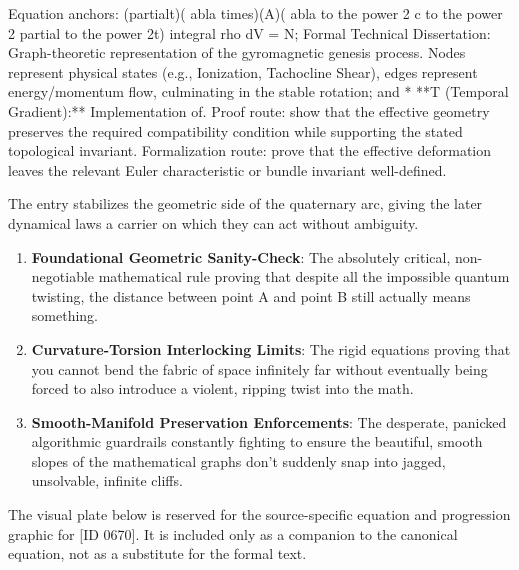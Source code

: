 Equation anchors: (partialt)( abla times)(A)( abla to the power 2   c to the power  2 partial to the power 2t) integral rho dV = N; Formal Technical Dissertation: Graph-theoretic representation of the gyromagnetic genesis process. Nodes represent physical states (e.g., Ionization, Tachocline Shear), edges represent energy/momentum flow, culminating in the stable rotation; and * **T (Temporal Gradient):** Implementation of. Proof route: show that the effective geometry preserves the required compatibility condition while supporting the stated topological invariant. Formalization route: prove that the effective deformation leaves the relevant Euler characteristic or bundle invariant well-defined.

The entry stabilizes the geometric side of the quaternary arc, giving the later dynamical laws a carrier on which they can act without ambiguity.
\endgroup

\begin{enumerate}[leftmargin=1.6em,itemsep=6pt,topsep=4pt]
\item \textbf{Foundational Geometric Sanity-Check}: The absolutely critical, non-negotiable mathematical rule proving that despite all the impossible quantum twisting, the distance between point A and point B still actually means something.
\item \textbf{Curvature-Torsion Interlocking Limits}: The rigid equations proving that you cannot bend the fabric of space infinitely far without eventually being forced to also introduce a violent, ripping twist into the math.
\item \textbf{Smooth-Manifold Preservation Enforcements}: The desperate, panicked algorithmic guardrails constantly fighting to ensure the beautiful, smooth slopes of the mathematical graphs don't suddenly snap into jagged, unsolvable, infinite cliffs.
\end{enumerate}

\begingroup\footnotesize\sloppy
The visual plate below is reserved for the source-specific equation and progression graphic for [ID 0670]. It is included only as a companion to the canonical equation, not as a substitute for the formal text.
\par\endgroup
\ifTZPDarkEdition
{}
\fi

